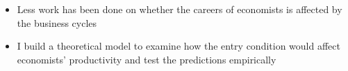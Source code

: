 \documentclass[11pt]{beamer}
\begin{document}
\begin{frame}
\begin{itemize}
			\item Less work has been done on whether the careers of economists is affected by the business cycles
			\item I build a theoretical model to examine how the entry condition would affect economists’ productivity and test the predictions empirically

		\end{itemize}
	\end{frame}
\end{document}
